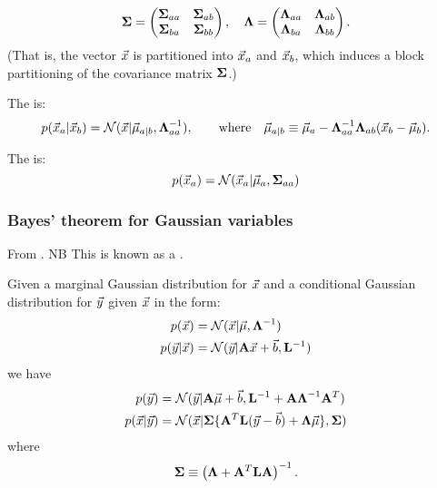 \documentclass[11pt]{article}
\begin{document}
\begin{appendices}
\begin{equation}
  \boldsymbol{\Sigma} =
  \left(
    \begin{matrix}
      \boldsymbol{\Sigma}_{aa} & \boldsymbol{\Sigma}_{ab} \\
      \boldsymbol{\Sigma}_{ba} & \boldsymbol{\Sigma}_{bb}
    \end{matrix}
  \right)
  , \quad
  \boldsymbol{\Lambda} =
  \left(
    \begin{matrix}
      \boldsymbol{\Lambda}_{aa} & \boldsymbol{\Lambda}_{ab} \\
      \boldsymbol{\Lambda}_{ba} & \boldsymbol{\Lambda}_{bb}
    \end{matrix}
  \right).
\end{equation}
(That is, the vector $\vec{x}$ is partitioned into $\vec{x}_a$ and $\vec{x}_b$, which
induces a block partitioning of the covariance matrix $\boldsymbol{\Sigma}$.)

The  is:
\begin{equation}
  \label{eq:gauss_part_cond}
  p(\vec{x}_a | \vec{x}_b) = \mathcal{N}(\vec{x} | \vec{\mu}_{a | b}, \boldsymbol{\Lambda}_{aa}^{-1}),
  \qquad  \textrm{where}\quad \vec{\mu}_{a | b} \equiv \vec{\mu}_a - \boldsymbol{\Lambda}_{aa}^{-1}
  \boldsymbol{\Lambda}_{ab} (\vec{x}_b - \vec{\mu}_b).
\end{equation}

The  is:
\begin{equation}
  \label{eq:gauss_part_marg}
  p(\vec{x}_a) = \mathcal{N}(\vec{x}_a | \vec{\mu}_a, \boldsymbol{\Sigma}_{aa})
\end{equation}

\subsubsection{Bayes' theorem for Gaussian variables}
From \cite[section 2.3.3]{BISHOP}. NB This is known as a .

Given a marginal Gaussian distribution for $\vec{x}$ and a conditional Gaussian
distribution for $\vec{y}$ given $\vec{x}$ in the form:
\begin{align}
  p(\vec{x})       &= \mathcal{N}(\vec{x} | \vec{\mu}, \boldsymbol{\Lambda}^{-1})\\
  p(\vec{y}|\vec{x}) &= \mathcal{N}(\vec{y} | \mathbf{A} \vec{x} + \vec{b}, \mathbf{L}^{-1})
\end{align}
we have
\begin{align}
  \label{eq:gauss_bayes_marg}
  p(\vec{y})       &= \mathcal{N} (\vec{y} |\mathbf{A} \vec{\mu} + \vec{b}, \mathbf{L}^{-1} + \mathbf{A}
                   \boldsymbol{\Lambda}^{-1} \mathbf{A}^T )\\
  \label{eq:gauss_bayes_cond}
  p(\vec{x}|\vec{y}) &= \mathcal{N} ( \vec{x} | \boldsymbol{\Sigma} \{ \mathbf{A}^T \mathbf{L} (\vec{y} - \vec{b}) +
                   \boldsymbol{\Lambda} \vec{\mu} \}, \boldsymbol{\Sigma})
\end{align}
where
\begin{equation}
  \boldsymbol{\Sigma} \equiv \left(\boldsymbol{\Lambda} + \mathbf{A}^T \mathbf{L} \mathbf{A} \right)^{-1}.
\end{equation}



\end{appendices}
\end{document}

